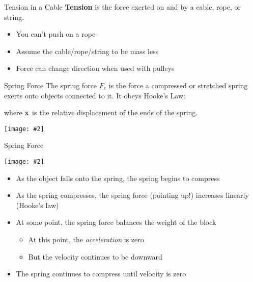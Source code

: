 \documentclass[12pt,compress,aspectratio=169]{beamer}
\newcommand{\pic}[2]{\texttt{[image: \#2]}}
\newcommand{\mb}[1]{\ensuremath\mathbf{#1}}
\newcommand{\eq}[2]{\vspace{#1}{\Large\begin{displaymath}#2\end{displaymath}}}
\begin{document}
\begin{frame}{Tension in a Cable}
  \textbf{Tension} is the force exerted on and by a cable, rope,
  or string.

  \begin{itemize}
  \item You can't push on a rope
  \item Assume the cable/rope/string to be mass less
  \item Force can change direction when used with pulleys
  \end{itemize}
\end{frame}



\begin{frame}{Spring Force}
  The spring force $F_e$ is the force a compressed or stretched spring
  exerts onto objects connected to it. It obeys Hooke's Law:
  
  \eq{-.2in}{
    \mb{F}_e=-k\mb{x}
  }
  where $\mb{x}$ is the relative displacement of the ends of the spring.
  \begin{center}
    \pic{.35}{graphics/spring-example1.png}
  \end{center}
\end{frame}


\begin{frame}{Spring Force}
  \begin{center}
    \pic{.3}{graphics/spring-example1.png}
  \end{center}
  \begin{itemize}
  \item As the object falls onto the spring, the spring begins to compress
  \item As the spring compresses, the spring force (pointing up!) increases
    linearly (Hooke's law)
  \item At some point, the spring force balances the weight of the block
    \begin{itemize}
    \item At this point, the \emph{acceleration} is zero
    \item But the velocity continues to be downward
    \end{itemize}
  \item The spring continues to compress until velocity is zero
  \end{itemize}
\end{frame}
\end{document}

